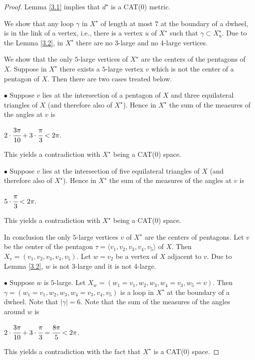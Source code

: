 \documentclass[10pt,a4paper]{amsart}
\begin{document}
\begin{proof}
Lemma \ref{3.1} implies that $d^{\star}$ is a CAT(0) metric.

We show that any loop $\gamma$ in $X^{\star}$ of length at most $7$ at the boundary of a dwheel, is in the link of a vertex, i.e., there is a vertex $u$ of $X^{\star}$ such that $\gamma \subset X^{\star}_{u}$. 
Due to the Lemma \ref{3.2}, in $X^{\star}$ there are no $3$-large and no $4$-large vertices. 

 
We show that the only $5$-large vertices of $X^{\star}$ are the centers of the pentagons of $X$. Suppose in $X^{\star}$ there exists a $5$-large vertex $v$ which is not the center of a pentagon of $X$. Then there are two cases treated below.

$\bullet$ Suppose $v$ lies at the intersection of a pentagon of $X$ and three equilateral triangles of $X$ (and therefore also of $X^{\star}$). Hence in $X^{\star}$ the sum of the measures of the angles at $v$ is
\begin{center}
$2 \cdot \cfrac{3 \pi}{10} + 3 \cdot \cfrac{\pi}{3} < 2 \pi.$
\end{center} This yields a contradiction with $X^{\star}$ being a CAT(0) space.


$\bullet$ Suppose $v$ lies at the intersection of five equilateral triangles of $X$ (and therefore also of $X^{\star}$). Hence in $X^{\star}$ the sum of the measures of the angles at $v$ is
\begin{center}
$5 \cdot \cfrac{\pi}{3} < 2 \pi.$
\end{center} This yields a contradiction with $X^{\star}$ being a CAT(0) space. 

In conclusion the only $5$-large vertices $v$ of $X^{\star}$ are the centers of pentagons. Let $v$ be the center of the pentagon $\tau = \langle v_{1}, v_{2}, v_{3}, v_{4}, v_{5} \rangle$ of $X$. Then $X_{v} = (v_{1}, v_{2}, v_{3}, v_{4}, v_{5})$.
Let $w=v_{2}$ be a vertex of $X$ adjacent to $v$. Due to Lemma \ref{3.2}, $w$ is not $3$-large and it is not $4$-large.


$\bullet$ Suppose $w$ is $5$-large. Let $X_{w} = (w_{1}=v_{1}, w_{2}, w_{3}, w_{4}=v_{3}, w_{5} = v)$. Then $\gamma = (w_{1}=v_{1}, w_{2}, w_{3}, w_{4}=v_{3}, v_{4}, v_{5})$ is a loop in $X^{\star}$ at the boundary of a dwheel. Note that $|\gamma| = 6$. Note that the sum of the measures of the angles around $w$ is
\begin{center}
$2 \cdot \cfrac{3 \pi}{10} + 3 \cdot \cfrac{\pi}{3} = \cfrac{8 \pi}{5} < 2 \pi$. \end{center} This yields a contradiction with the fact that $X^{\star}$ is a CAT(0) space.



\end{proof}
\end{document}
